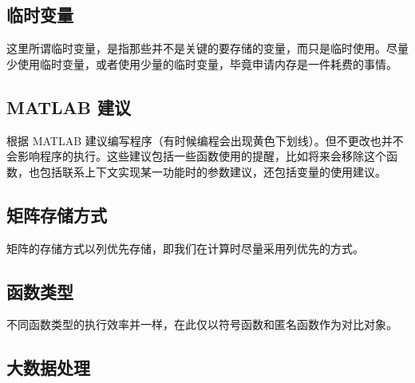 \subsection{临时变量}

这里所谓临时变量，是指那些并不是关键的要存储的变量，而只是临时使用。尽量少使用临时变量，或者使用少量的临时变量，毕竟申请内存是一件耗费的事情。





\subsection{MATLAB 建议}

根据 MATLAB 建议编写程序（有时候编程会出现黄色下划线）。但不更改也并不会影响程序的执行。这些建议包括一些函数使用的提醒，比如将来会移除这个函数，也包括联系上下文实现某一功能时的参数建议，还包括变量的使用建议。





\subsection{矩阵存储方式}

矩阵的存储方式以列优先存储，即我们在计算时尽量采用列优先的方式。

\vspace{-0.8cm}


\vspace{-0.8cm}


\subsection{函数类型}

不同函数类型的执行效率并一样，在此仅以符号函数和匿名函数作为对比对象。

\vspace{-0.8cm}


\vspace{-0.8cm}






\subsection{大数据处理}

